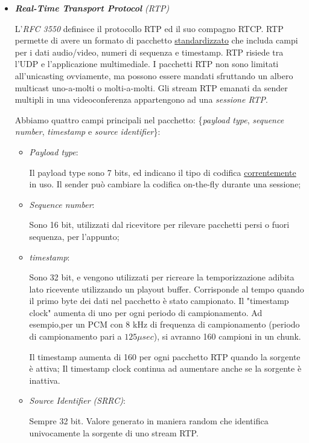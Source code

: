 \begin{itemize}

\item{\textit{\textbf{Real-Time Transport Protocol} (RTP)}}

L'\textit{RFC 3550} definisce il protocollo RTP ed il suo compagno RTCP. RTP permette di avere un formato di pacchetto \underline{standardizzato} che includa campi per i dati audio/video, numeri di sequenza e timestamp. RTP risiede tra l'UDP e l'applicazione multimediale. I pacchetti RTP non sono limitati all'unicasting ovviamente, ma possono essere mandati sfruttando un albero multicast uno-a-molti o molti-a-molti. Gli stream RTP emanati da sender multipli in una videoconferenza appartengono ad una \textit{sessione RTP}.

Abbiamo quattro campi principali nel pacchetto: \{\textit{payload type}, \textit{sequence number}, \textit{timestamp} e \textit{source identifier}\}:

\begin{itemize}

\item{\textit{Payload type}}:

Il payload type sono 7 bits, ed indicano il tipo di codifica \underline{correntemente} in uso. Il sender può cambiare la codifica on-the-fly durante una sessione;

\item{\textit{Sequence number}}:

Sono 16 bit, utilizzati dal ricevitore per rilevare pacchetti persi o fuori sequenza, per l'appunto;

\item{\textit{timestamp}}:

Sono 32 bit, e vengono utilizzati per ricreare la temporizzazione adibita lato ricevente utilizzando un playout buffer. Corrisponde al tempo quando il primo byte dei dati nel pacchetto è stato campionato. Il "timestamp clock" aumenta di uno per ogni periodo di campionamento. Ad esempio,per un PCM con 8 kHz di frequenza di campionamento (periodo di campionamento pari a $125 \mu sec$), si avranno 160 campioni in un chunk.

Il timestamp aumenta di 160 per ogni pacchetto RTP quando la sorgente è attiva;
Il timestamp clock continua ad aumentare anche se la sorgente è inattiva.

\item{\textit{Source Identifier (SRRC)}}:

Sempre 32 bit. Valore generato in maniera random che identifica univocamente la sorgente di uno stream RTP.


\end{itemize}
\end{itemize}

